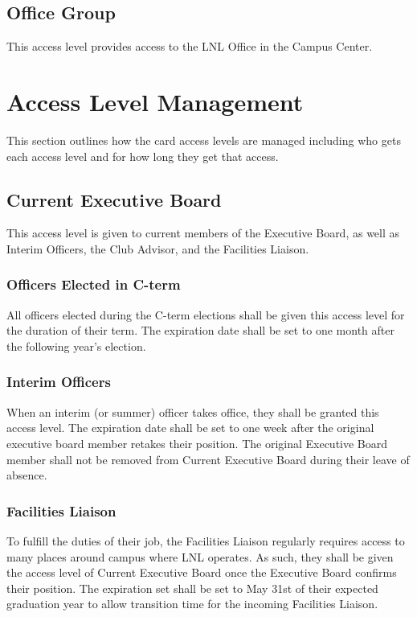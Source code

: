 \documentclass[12pt,letterpaper,oneside]{book}
\begin{document}
\subsection{Office Group}
This access level provides access to the LNL Office in the Campus Center.

\section{Access Level Management}
This section outlines how the card access levels are managed including who gets each access level and for how long they get that access.

\subsection{Current Executive Board}
This access level is given to current members of the Executive Board, as well as Interim Officers, the Club Advisor, and the Facilities Liaison.

\subsubsection{Officers Elected in C-term}
All officers elected during the C-term elections shall be given this access level for the duration of their term. The expiration date shall be set to one month after the following year's election.

\subsubsection{Interim Officers}
When an interim (or summer) officer takes office, they shall be granted this access level. The expiration date shall be set to one week after the original executive board member retakes their position. The original Executive Board member shall not be removed from Current Executive Board during their leave of absence.

\subsubsection{Facilities Liaison}
To fulfill the duties of their job, the Facilities Liaison regularly requires access to many places around campus where LNL operates. As such, they shall be given the access level of Current Executive Board once the Executive Board confirms their position. The expiration set shall be set to May 31st of their expected graduation year to allow transition time for the incoming Facilities Liaison.
\end{document}
